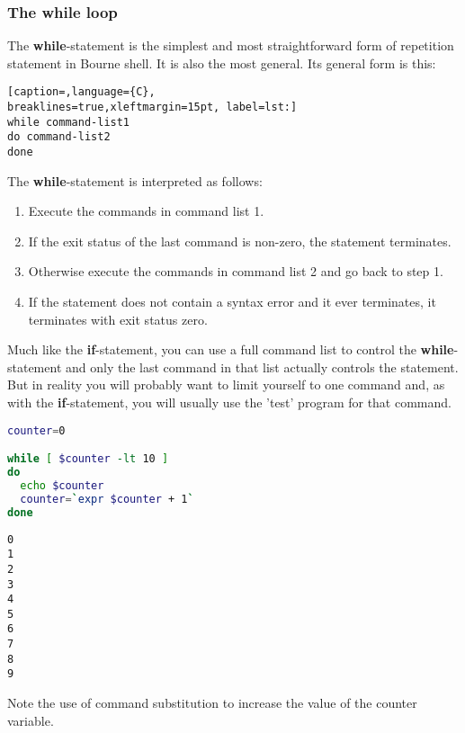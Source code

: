 \subsubsection{The while loop}
The \textbf{while}-statement is the simplest and most straightforward form of
repetition statement in Bourne shell. It is also the most general. Its general
form is this:

\lstset{basicstyle=\scriptsize, numbers=left, captionpos=b, tabsize=4}
\begin{lstlisting}[caption=,language={C},
breaklines=true,xleftmargin=15pt, label=lst:]
while command-list1
do command-list2
done
\end{lstlisting}

The \textbf{while}-statement is interpreted as follows:
\begin{enumerate}
\setlength{\leftmargin}{0pt}
\setlength{\itemsep}{0pt}
\setlength{\parsep}{0pt}
\setlength{\parskip}{0pt}
	\item Execute the commands in command list 1.
	\item If the exit status of the last command is non-zero, the statement
terminates.
	\item Otherwise execute the commands in command list 2 and go back to step
1.
	\item If the statement does not contain a syntax error and it ever
terminates, it terminates with exit status zero.
\end{enumerate}

Much like the \textbf{if}-statement, you can use a full command list to control
the \textbf{while}-statement and only the last command in that list actually
controls the statement. But in reality you will probably want to limit yourself
to one command and, as with the \textbf{if}-statement, you will usually use the
'test' program for that command.
\lstset{basicstyle=\scriptsize, numbers=left, captionpos=b, tabsize=4}
\begin{lstlisting}[caption=A while loop that prints all the values between 0 and 10,language={bash},
breaklines=true,xleftmargin=15pt,label=lst:A while loop that prints all the values between 0 and 10]
counter=0

while [ $counter -lt 10 ]
do
  echo $counter
  counter=`expr $counter + 1`
done
\end{lstlisting}

\scriptsize
\begin{verbatim}
0
1
2
3
4
5
6
7
8
9
\end{verbatim}
\normalsize
Note the use of command substitution to increase the value of the counter
variable.

